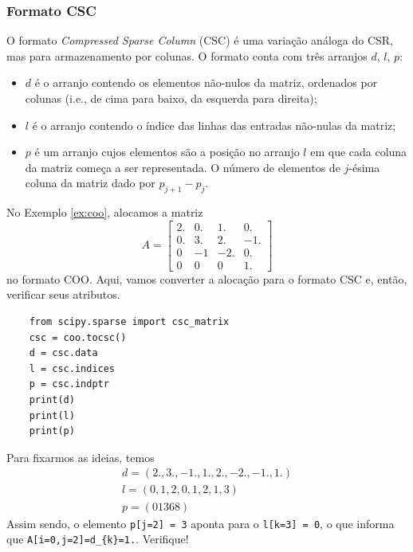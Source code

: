 \subsubsection{Formato CSC}

O formato {\it Compressed Sparse Column} (CSC) é uma variação análoga do CSR, mas para armazenamento por colunas. O formato conta com três arranjos $d$, $l$, $p$:
\begin{itemize}
\item $d$ é o arranjo contendo os elementos não-nulos da matriz, ordenados por colunas (i.e., de cima para baixo, da esquerda para direita);
\item $l$ é o arranjo contendo o índice das linhas das entradas não-nulas da matriz;
\item $p$ é um arranjo cujos elementos são a posição no arranjo $l$ em que cada coluna da matriz começa a ser representada. O número de elementos de $j$-ésima coluna da matriz dado por $p_{j+1}-p_j$.
\end{itemize}

\begin{ex}
  No Exemplo \ref{ex:coo}, alocamos a matriz
  \begin{equation}
    A =
    \begin{bmatrix}
      2. & 0. & 1.  & 0. \\
      0. & 3. & 2.  & -1.\\
      0  & -1 & -2. & 0. \\
      0  & 0  & 0   & 1.
    \end{bmatrix}
  \end{equation}
  no formato COO. Aqui, vamos converter a alocação para o formato CSC e, então, verificar seus atributos.
  \begin{lstlisting}
    from scipy.sparse import csc_matrix
    csc = coo.tocsc()
    d = csc.data
    l = csc.indices
    p = csc.indptr
    print(d)
    print(l)
    print(p)
  \end{lstlisting}
  Para fixarmos as ideias, temos
  \begin{gather}
    d = (2.,  3., -1.,  1.,  2., -2., -1.,  1.)\\
    l = (0, 1, 2, 0, 1, 2, 1, 3)\\
    p = (0 1 3 6 8)
  \end{gather}
  Assim sendo, o elemento \lstinline+p[j=2] = 3+ aponta para o \lstinline+l[k=3] = 0+, o que informa que \lstinline+A[i=0,j=2]=d_{k}=1.+. Verifique!
\end{ex}


